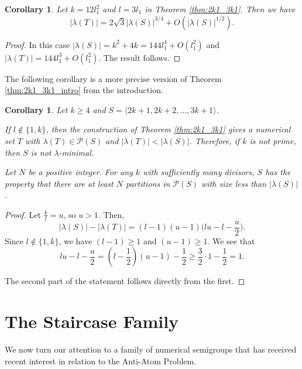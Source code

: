 \documentclass{amsproc}
\newtheorem{corollary}[theorem]{Corollary}
\theoremstyle{definition}
\theoremstyle{remark}
\numberwithin{equation}{section}
\begin{document}
\begin{corollary}
Let $k=12l_1^2$ and $l=3l_1$ in Theorem \ref{thm:2k1_3k1}. Then we have
\[
|\lambda(T)| =2\sqrt{3} |\lambda(S)|^{3/4} +O(|\lambda(S)|^{1/2}).
\]
\end{corollary}
\begin{proof}

In this case $|\lambda(S)|=k^2+4k=144l_1^4+O(l_1^2)$ and $|\lambda(T)|=144l_1^3+O(l_1^2)$. The result follows.
\end{proof}

The following corollary is a more precise version of Theorem \ref{thm:2k1_3k1_intro} from the introduction.
\begin{corollary}
Let $k \ge 4$ and $S = \langle 2k+1, 2k+2,\ldots, 3k+1\rangle$.  

If $l \not\in \{1,k\}$, then the construction of Theorem \ref{thm:2k1_3k1} gives a numerical set $T$ with $\lambda(T) \in \mathcal{P}(S)$ and $|\lambda(T)| < |\lambda(S)|$.  Therefore, if $k$ is not prime, then $S$ is not $\lambda$-minimal.

Let $N$ be a positive integer.  For any $k$ with sufficiently many divisors, $S$ has the property that there are at least $N$ partitions in $\mathcal{P}(S)$ with size less than $|\lambda(S)|$.
\end{corollary}
\begin{proof}
Let $\frac{k}{l} =u$, so $u>1$. Then,
\[
|\lambda(S)|-|\lambda(T)| = (l-1)(u-1)\Big(lu-l-\frac{u}{2}\Big).
\]
Since $l \not\in \{1,k\}$, we have $(l-1)\ge 1$ and $(u-1)\ge 1$.  We see that
\[
lu-l-\frac{u}{2}=\left(l-\frac{1}{2}\right)(u-1)-\frac{1}{2} \geq \frac{3}{2} \cdot 1-\frac{1}{2}=1.
\]

The second part of the statement follows directly from the first.
\end{proof}



\section{The Staircase Family}\label{sec:staircase}
We now turn our attention to a family of numerical semigroups that has received recent interest in relation to the Anti-Atom Problem. 
\end{document}
